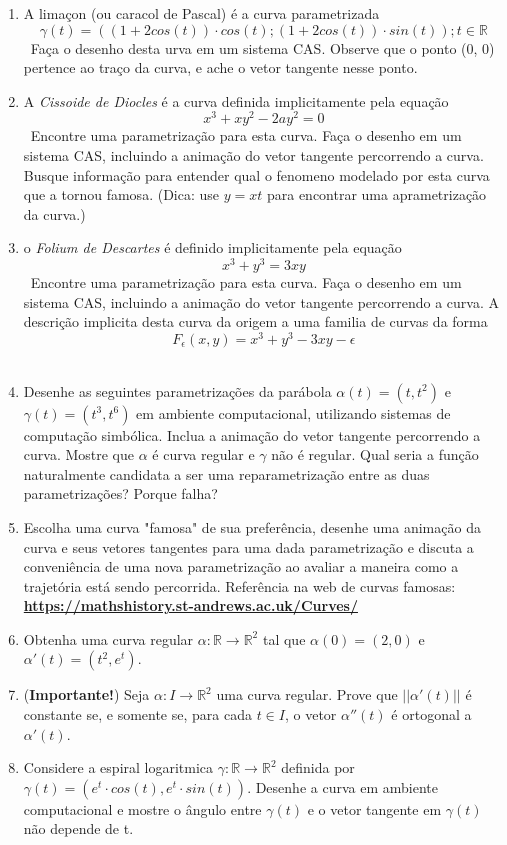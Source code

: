 \documentclass{article}
\begin{document}
\begin{enumerate}
    \item A limaçon (ou caracol de Pascal) é a curva parametrizada \
        $$\gamma(t) = ((1+2cos(t)) \cdot cos(t); (1+2cos(t)) \cdot sin(t)); t \in \mathbb{R}$$ \
        Faça o desenho desta urva em um sistema CAS. Observe que o ponto (0, 0) pertence ao traço da curva, e ache o vetor tangente nesse ponto. \
    \item A \textit{Cissoide de Diocles} é a curva definida implicitamente pela equação \
        $$x^3+xy^2-2ay^2=0$$ \
        Encontre uma parametrização para esta curva. Faça o desenho em um sistema CAS, incluindo a animação do vetor tangente percorrendo a curva. Busque informação para entender qual o fenomeno modelado por esta curva que a tornou famosa. (Dica: use $y = xt$ para encontrar uma aprametrização da curva.) \
    \item o \textit{Folium de Descartes} é definido implicitamente pela equação \
        $$x^3+y^3 = 3xy$$ \
        Encontre uma parametrização para esta curva. Faça o desenho em um sistema CAS, incluindo a animação do vetor tangente percorrendo a curva. A descrição implicita desta curva da origem a uma familia de curvas da forma \
        $$F_{\epsilon}(x, y) = x^3 + y^3 - 3xy - \epsilon$$ \
    \item Desenhe as seguintes parametrizações da parábola $\alpha(t) = (t,t^2)$ e $\gamma(t) = (t^3,t^6)$ em ambiente computacional, utilizando sistemas de computação simbólica. Inclua a animação do vetor tangente percorrendo a curva. Mostre que $\alpha$ é curva regular e $\gamma$ não é regular. Qual seria a função naturalmente candidata a ser uma reparametrização entre as duas parametrizações? Porque falha? \
    \item Escolha uma curva "famosa" de sua preferência, desenhe uma animação da curva e seus vetores tangentes para uma dada parametrização e discuta a conveniência de uma nova parametrização ao avaliar a maneira como a trajetória está sendo percorrida. Referência na web de curvas famosas: \href{https://mathshistory.st-andrews.ac.uk/
    Curves/}{\textbf{https://mathshistory.st-andrews.ac.uk/Curves/}} \
    \item Obtenha uma curva regular $\alpha : \mathbb{R} \to \mathbb{R}^2$ tal que $\alpha(0) = (2, 0)$ e $\alpha'(t) = (t^2, e^t)$. \
    \item (\textbf{Importante!}) Seja $\alpha : I \to \mathbb{R}^2$ uma curva regular. Prove que $||\alpha'(t)||$ é constante se, e somente se, para cada $t \in I$, o vetor $\alpha''(t)$ é ortogonal a $\alpha'(t)$. \
    \item Considere a espiral logaritmica $\gamma : \mathbb{R} \to \mathbb{R}^2$ definida por $\gamma(t) = (e^t \cdot cos(t), e^t \cdot sin(t))$. Desenhe a curva em ambiente computacional e mostre o ângulo entre $\gamma(t)$ e o vetor tangente em $\gamma(t)$ não depende de t. \ 
\end{enumerate}
\end{document}
